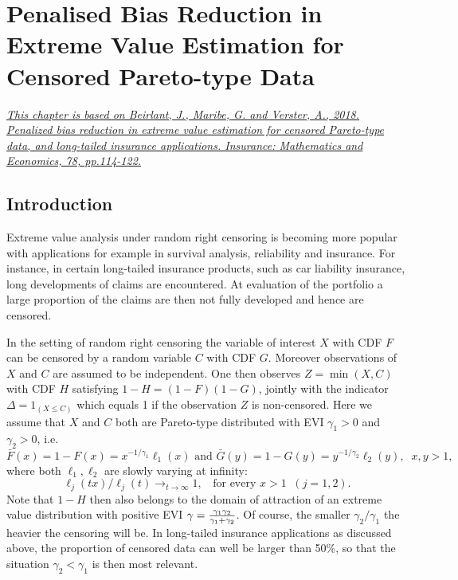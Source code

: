 \chapter{Penalised Bias Reduction in Extreme Value Estimation for Censored Pareto-type Data}\label{chap4}
\setcounter{equation}{0}
\href{https://www.sciencedirect.com/science/article/pii/S0167668717302573}{\textit{This chapter is based on Beirlant, J., Maribe, G. and Verster, A., 2018. Penalized bias reduction in extreme value estimation for censored Pareto-type data, and long-tailed insurance applications. Insurance: Mathematics and Economics, 78, pp.114-122.}}

\section{Introduction} %
\label{Sec1}       %
Extreme value analysis under random right censoring is becoming more popular with applications for example in survival analysis, reliability and insurance. For instance, in certain long-tailed insurance products, such as car liability insurance, long developments of claims are encountered. At evaluation of the portfolio a large proportion of the claims are then not fully developed and hence are censored.

\vspace{0.3cm}
In the setting of random right censoring the variable of interest $X$ with CDF $F$ can be censored by a random variable $C$ with CDF $G$. Moreover observations of $X$ and $C$ are assumed to be independent. One then observes $Z=\min (X,C)$ with CDF $H$ satisfying 
$1-H=(1-F)(1-G)$, jointly with the indicator $\Delta =1_{(X \leq C)}$ which equals 1 if the observation $Z$ is non-censored. Here we assume that $X$ and $C$ both are Pareto-type distributed with EVI $\gamma_1 >0$ and $\gamma_2 >0$, i.e. 
\[
\bar{F} (x) = 1-F(x) = x^{-1/\gamma_1}\ell_1 (x) \mbox{ and } \bar{G}(y) = 1-G(y) = y^{-1/\gamma_2}\ell_2 (y), \;\; x,y>1,
\]
where both $\ell_1, \ell_2$ are slowly varying at infinity:
\[
\ell_j(tx)/\ell_j (t) \to_{t \to \infty} 1, \;\; \mbox{ for every } x>1 \;\; (j=1,2).
\]
Note that $1-H$ then also belongs to the domain of attraction of an extreme value distribution with positive EVI $\gamma = { {\gamma_1 \gamma_2}\over{\gamma_1+\gamma_2}}$.
Of course, the smaller $\gamma_2/\gamma_1$ the heavier the censoring will be. In long-tailed insurance applications as discussed above, the proportion of censored data can well be larger than 50\%, so that the situation $\gamma_2 < \gamma_1$ is then most relevant.

